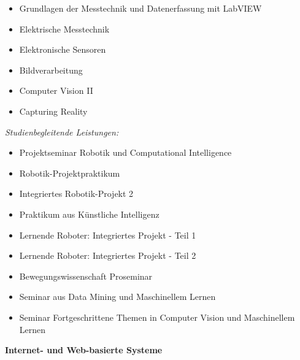 {    \begin{itemize}[noitemsep]
        \item Grundlagen der Messtechnik und Datenerfassung mit LabVIEW
        \item Elektrische Messtechnik
        \item Elektronische Sensoren
        \item Bildverarbeitung
        \item Computer Vision II
        \item Capturing Reality
    \end{itemize}
    \textit{Studienbegleitende Leistungen:}
    \begin{itemize}[noitemsep]
        \item Projektseminar Robotik und Computational Intelligence
        \item Robotik-Projektpraktikum
        \item Integriertes Robotik-Projekt 2
        \item Praktikum aus Künstliche Intelligenz
        \item Lernende Roboter: Integriertes Projekt - Teil 1
        \item Lernende Roboter: Integriertes Projekt - Teil 2
        \item Bewegungswissenschaft Proseminar
        \item Seminar aus Data Mining und Maschinellem Lernen
        \item Seminar Fortgeschrittene Themen in Computer Vision und Maschinellem Lernen
    \end{itemize}

    \noindent\textbf{Internet- und Web-basierte Systeme}

}
